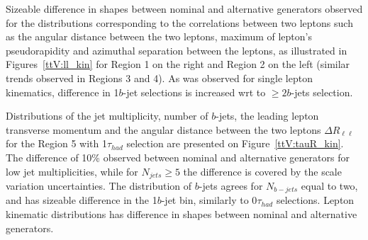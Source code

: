 Sizeable difference in shapes between nominal and alternative generators observed for the distributions corresponding to the correlations between two leptons such as the angular distance between the two leptons, maximum of lepton's pseudorapidity and azimuthal separation between the leptons, as illustrated in Figures~\ref{ttV:ll_kin} for Region 1 on the right and Region 2 on the left (similar trends observed in Regions 3 and 4).
As was observed for single lepton kinematics, difference in 1$b$-jet selections is increased wrt to $\geq2b$-jets selection.

Distributions of the jet multiplicity, number of $b$-jets, the leading lepton transverse momentum and the angular distance between the two leptons  $\Delta R _{\ell \ell }$ for the Region 5 with 1$\tau_{had}$ selection are presented on Figure~\ref{ttV:tauR_kin}.
The difference of 10\% observed between nominal and alternative generators for low jet multiplicities, while for $N_{jets}\geq5$ the difference is covered by the scale variation uncertainties. 
The distribution of $b$-jets agrees for $N_{b-jets}$ equal to two, and has sizeable difference in the 1$b$-jet bin, similarly to 0$\tau_{had}$ selections.
Lepton kinematic distributions has difference in shapes between nominal and alternative generators.

